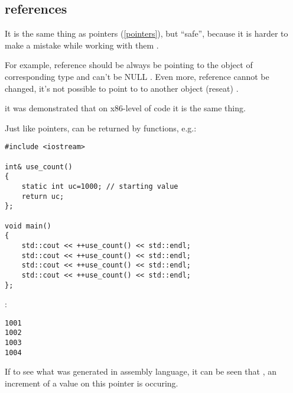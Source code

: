 ﻿\subsection{references}

{It is the same thing as pointers (\ref{pointers}), but ``safe'', 
because it is harder to make a mistake while working with them}
\cite[8.3.2]{CPP11}.

{For example, reference should be always be pointing to the object of corresponding type and can't be NULL}
\cite[8.6]{ParashiftCPPFAQ}.
{Even more, reference cannot be changed, it's not possible to point to to another object (reseat)}
\cite[8.5]{ParashiftCPPFAQ}.

 \cite[1.7.1]{REBook} 
{it was demonstrated that on x86-level of code it is the same thing}.

{Just like pointers,  can be returned by functions, e.g.}:

\begin{lstlisting}
#include <iostream>
 
int& use_count()
{
	static int uc=1000; // starting value
	return uc;
};
 
void main()
{
	std::cout << ++use_count() << std::endl;
	std::cout << ++use_count() << std::endl;
	std::cout << ++use_count() << std::endl;
	std::cout << ++use_count() << std::endl;
};
\end{lstlisting}

:

\begin{lstlisting}
1001
1002
1003
1004
\end{lstlisting}

{If to see what was generated in assembly language, it can be seen that}  
 , 
  
{an increment of a value on this pointer is occuring}.

